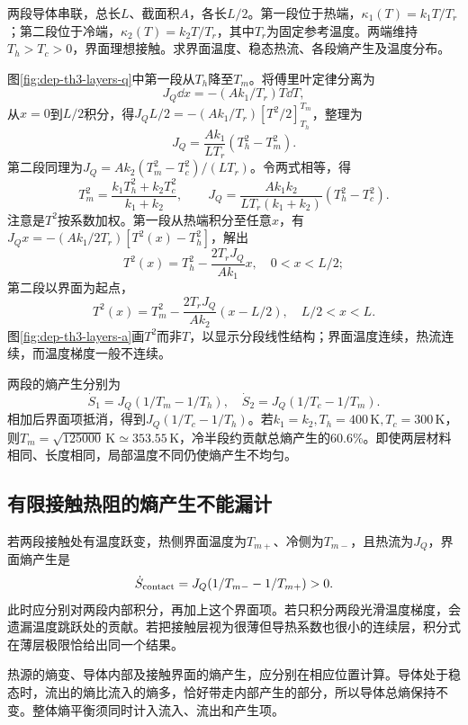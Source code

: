 \begin{example}[两层温变导体的界面温度]
两段导体串联，总长$L$、截面积$A$，各长$L/2$。第一段位于热端，$\kappa_1(T)=k_1T/T_r$；第二段位于冷端，$\kappa_2(T)=k_2T/T_r$，其中$T_r$为固定参考温度。两端维持$T_h>T_c>0$，界面理想接触。求界面温度、稳态热流、各段熵产生及温度分布。
\end{example}
\begin{solution}
图\ref{fig:dep-th3-layers-q}中第一段从$T_h$降至$T_m$。将傅里叶定律分离为
\[
 J_Q\dd x=-(Ak_1/T_r)T\dd T,
\]
从$x=0$到$L/2$积分，得$J_QL/2=-(Ak_1/T_r)[T^2/2]_{T_h}^{T_m}$，整理为
\[
 J_Q=\frac{Ak_1}{LT_r}(T_h^2-T_m^2).
\]
第二段同理为$J_Q=Ak_2(T_m^2-T_c^2)/(LT_r)$。令两式相等，得
\[
 T_m^2=\frac{k_1T_h^2+k_2T_c^2}{k_1+k_2},\qquad
 J_Q=\frac{Ak_1k_2}{LT_r(k_1+k_2)}(T_h^2-T_c^2).
\]
注意是$T^2$按系数加权。第一段从热端积分至任意$x$，有$J_Qx=-(Ak_1/2T_r)[T^2(x)-T_h^2]$，解出
\[
 T^2(x)=T_h^2-\frac{2T_rJ_Q}{Ak_1}x,
 \quad 0<x<L/2;
\]
第二段以界面为起点，
\[
 T^2(x)=T_m^2-\frac{2T_rJ_Q}{Ak_2}(x-L/2),
 \quad L/2<x<L.
\]
图\ref{fig:dep-th3-layers-a}画$T^2$而非$T$，以显示分段线性结构；界面温度连续，热流连续，而温度梯度一般不连续。

两段的熵产生分别为
\[
 \dot S_1=J_Q(1/T_m-1/T_h),\quad
 \dot S_2=J_Q(1/T_c-1/T_m).
\]
相加后界面项抵消，得到$J_Q(1/T_c-1/T_h)$。若$k_1=k_2,T_h=400\,\mathrm K,T_c=300\,\mathrm K$，则$T_m=\sqrt{125000}\,\mathrm K\simeq353.55\,\mathrm K$，冷半段约贡献总熵产生的60.6\%。即使两层材料相同、长度相同，局部温度不同仍使熵产生不均匀。
\end{solution}

\subsection{有限接触热阻的熵产生不能漏计}
若两段接触处有温度跃变，热侧界面温度为$T_{m+}$、冷侧为$T_{m-}$，且热流为$J_Q$，界面熵产生是
\[
 \dot S_{\rm contact}=J_Q(1/T_{m-}-1/T_{m+})>0.
\]
此时应分别对两段内部积分，再加上这个界面项。若只积分两段光滑温度梯度，会遗漏温度跳跃处的贡献。若把接触层视为很薄但导热系数也很小的连续层，积分式在薄层极限恰给出同一个结果。

热源的熵变、导体内部及接触界面的熵产生，应分别在相应位置计算。导体处于稳态时，流出的熵比流入的熵多，恰好带走内部产生的部分，所以导体总熵保持不变。整体熵平衡须同时计入流入、流出和产生项。
